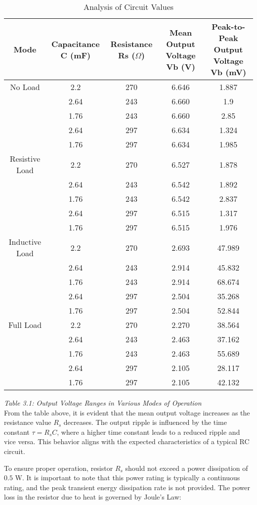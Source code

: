 \begin{table}[htbp]
\centering
\caption{Analysis of Circuit Values}
\begin{tabular}{|c|c|c|c|c|}
\hline
\textbf{Mode} & \textbf{Capacitance C (mF)} & \textbf{Resistance Rs ($\Omega$)} & \textbf{Mean Output Voltage Vb (V)} & \textbf{Peak-to-Peak Output Voltage Vb (mV)} \\
\hline
No Load & 2.2 & 270 & 6.646 & 1.887 \\
& 2.64 & 243 & 6.660 & 1.9 \\
& 1.76 & 243 & 6.660 & 2.85 \\
& 2.64 & 297 & 6.634 & 1.324 \\
& 1.76 & 297 & 6.634 & 1.985 \\
\hline
Resistive Load & 2.2 & 270 & 6.527 & 1.878 \\
& 2.64 & 243 & 6.542 & 1.892 \\
& 1.76 & 243 & 6.542 & 2.837 \\
& 2.64 & 297 & 6.515 & 1.317 \\
& 1.76 & 297 & 6.515 & 1.976 \\
\hline
Inductive Load & 2.2 & 270 & 2.693 & 47.989 \\
& 2.64 & 243 & 2.914 & 45.832 \\
& 1.76 & 243 & 2.914 & 68.674 \\
& 2.64 & 297 & 2.504 & 35.268 \\
& 1.76 & 297 & 2.504 & 52.844 \\
\hline
Full Load & 2.2 & 270 & 2.270 & 38.564 \\
& 2.64 & 243 & 2.463 & 37.162 \\
& 1.76 & 243 & 2.463 & 55.689 \\
& 2.64 & 297 & 2.105 & 28.117 \\
& 1.76 & 297 & 2.105 & 42.132 \\
\hline
\end{tabular}
\end{table}

\emph{Table 3.1: Output Voltage Ranges in Various Modes of Operation}\\

From the table above, it is evident that the mean output voltage increases as the resistance value $R_s$ decreases. The output ripple is influenced by the time constant $\tau = R_sC$, where a higher time constant leads to a reduced ripple and vice versa. This behavior aligns with the expected characteristics of a typical RC circuit.

To ensure proper operation, resistor $R_s$ should not exceed a power dissipation of $0.5$ W. It is important to note that this power rating is typically a continuous rating, and the peak transient energy dissipation rate is not provided. The power loss in the resistor due to heat is governed by Joule's Law:

